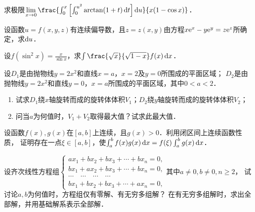 \documentclass[plain,noanswer,medmath]{../../template/jnuexam}
\begin{document}

\begin{problem}
求极限$\lim_{x \to 0} \frac{\int_0^x \left[\int_0^{u^2} \arctan(1 + t)\dt \right]\du}{x(1 - \cos x)}$．
\end{problem}



\begin{problem}
设函数$u = f(x,y,z)$有连续偏导数，且$z = z(x,y)$由方程$x\mathrm{e}^x - y\mathrm{e}^y = z\mathrm{e}^z$所确定，求$\mathop{}\!\mathrm{d} u$．
\end{problem}



\begin{problem}
设$f(\sin^2 x) = \frac{x}{\sin x}$，求$\int \frac{\sqrt{x}}{\sqrt{1 - x}} f(x)\dx$．
\end{problem}



\begin{problem}
设$D_1$是由抛物线$y = 2x^2$和直线$x = a$，$x = 2$及$y = 0$所围成的平面区域；
$D_2$是由抛物线$y = 2x^2$和直线$y = 0$，$x = a$所围成的平面区域，其中$0 < a < 2$．
\begin{enumerate}
\item 试求$D_1$绕$x$轴旋转而成的旋转体体积$V_1$；$D_2$绕$y$轴旋转而成的旋转体体积$V_2$；
\item 问当$a$为何值时，$V_1 + V_2$取得最大值？试求此最大值．
\end{enumerate}
\end{problem}






\begin{problem}
设函数$f(x),g(x)$在$[a,b]$上连续，且$g(x) > 0$．利用闭区间上连续函数性质，
证明存在一点$\xi \in[a,b]$，使$\int_a^b f(x)g(x)\mathop{}\!\mathrm{d} x = f(\xi) \int_a^b g(x)\mathop{}\!\mathrm{d} x$．
\end{problem}



\begin{problem}
设齐次线性方程组$\begin{cases}
  ax_1 + bx_2 + bx_3 + \cdots + bx_n = 0, \\
  bx_1 + ax_2 + bx_3 + \cdots + bx_n = 0, \\
   \cdots \quad \cdots \quad \cdots \quad \cdots \\
  bx_1 + bx_2 + bx_3 + \cdots + ax_n = 0,
\end{cases}$其中$a \ne 0,b \ne 0,n \ge 2$，
试讨论$a,b$为何值时，方程组仅有零解、有无穷多组解？
在有无穷多组解时，求出全部解，并用基础解系表示全部解．
\end{problem}
\end{document}
